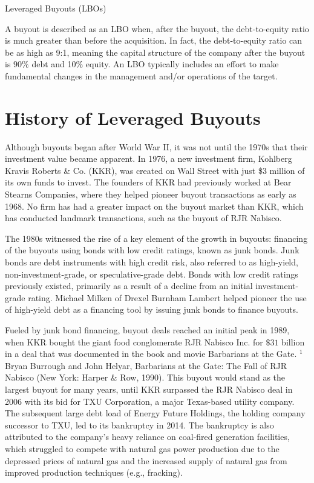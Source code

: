 \documentclass[11pt]{article}
\begin{document}
Leveraged Buyouts (LBOs)

A buyout is described as an LBO when, after the buyout, the debt-to-equity ratio is much greater than before the acquisition. In fact, the debt-to-equity ratio can be as high as 9:1, meaning the capital structure of the company after the buyout is $90 \%$ debt and 10\% equity. An LBO typically includes an effort to make fundamental changes in the management and/or operations of the target.

\section*{History of Leveraged Buyouts}
Although buyouts began after World War II, it was not until the 1970s that their investment value became apparent. In 1976, a new investment firm, Kohlberg Kravis Roberts \& Co. (KKR), was created on Wall Street with just \$3 million of its own funds to invest. The founders of KKR had previously worked at Bear Stearns Companies, where they helped pioneer buyout transactions as early as 1968. No firm has had a greater impact on the buyout market than KKR, which has conducted landmark transactions, such as the buyout of RJR Nabisco.

The 1980s witnessed the rise of a key element of the growth in buyouts: financing of the buyouts using bonds with low credit ratings, known as junk bonds. Junk bonds are debt instruments with high credit risk, also referred to as high-yield, non-investment-grade, or speculative-grade debt. Bonds with low credit ratings previously existed, primarily as a result of a decline from an initial investment-grade rating. Michael Milken of Drexel Burnham Lambert helped pioneer the use of high-yield debt as a financing tool by issuing junk bonds to finance buyouts.

Fueled by junk bond financing, buyout deals reached an initial peak in 1989, when KKR bought the giant food conglomerate RJR Nabisco Inc. for $\$ 31$ billion in a deal that was documented in the book and movie Barbarians at the Gate. ${ }^{1}$ Bryan Burrough and John Helyar, Barbarians at the Gate: The Fall of RJR Nabisco (New York: Harper \& Row, 1990). This buyout would stand as the largest buyout for many years, until KKR surpassed the RJR Nabisco deal in 2006 with its bid for TXU Corporation, a major Texas-based utility company. The subsequent large debt load of Energy Future Holdings, the holding company successor to TXU, led to its bankruptcy in 2014. The bankruptcy is also attributed to the company's heavy reliance on coal-fired generation facilities, which struggled to compete with natural gas power production due to the depressed prices of natural gas and the increased supply of natural gas from improved production techniques (e.g., fracking).
\end{document}
